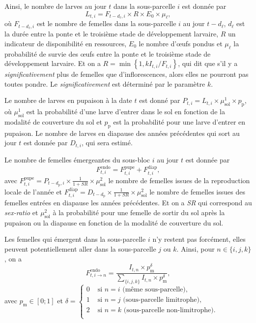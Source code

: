 Ainsi, le nombre de larves au jour $t$ dans la sous-parcelle $i$ est donnée par
\[
L_{t, i} = F_{t-d_{\ell}, i} \times R \times E_0 \times \mu_{\ell},
\]
où $F_{t-d_{\ell}, i}$ est le nombre de femelles dans la sous-parcelle $i$ au jour $t-d_{\ell}$, $d_{\ell}$ est la durée entre la ponte et le troisième stade de développement larvaire, $R$ un indicateur de disponibilité en ressources, $E_0$ le nombre d'œufs pondus et $\mu_{\ell}$ la probabilité de survie des œufs entre la ponte et le troisième stade de développement larvaire.
Et on a $R = \min\left\{1, k I_{t, i} / F_{t, i} \right\}$, qui dit que s'il y a \emph{significativement} plus de femelles que d'inflorescences, alors elles ne pourront pas toutes pondre. 
Le \emph{significativement} est déterminé par le paramètre $k$.

Le nombre de larves en pupaison à la date $t$ est donné par $P_{t, i} = L_{t, i} \times \mu^{1}_{\text{sol}} \times p_{\text{p}}$, où $\mu^{1}_{\text{sol}}$ est la probabilité d'une larve d'entrer dans le sol en fonction de la modalité de couverture du sol et $p_{\text{p}}$ est la probabilité pour une larve d'entrer en pupaison.
Le nombre de larves en diapause des années précédentes qui sort au jour $t$ est donnée par $D_{t, i}$, qui sera estimé.

Le nombre de femelles émergeantes du sous-bloc $i$ au jour $t$ est donnée par
\[
F^{\text{endo}}_{t, i} = F^{\text{pupe}}_{t, i} + F^{\text{diap}}_{t,i},
\]
avec $F^{\text{pupe}}_{t, i} = P_{t - d_{\text{p}}, i} \times \frac{1}{1 + SR} \times \mu^{2}_{\text{sol}}$ le nombre de femelles issues de la reproduction locale de l'année et $F_{t, i}^{\text{diap}} = D_{t -d_{\text{p}}} \times \frac{1}{1 + SR} \times \mu^{2}_{\text{sol}}$ le nombre de femelles issues des femelles entrées en diapause les années précédentes.
Et on a \textit{SR} qui correspond au \emph{sex-ratio} et $\mu^{2}_{\text{sol}}$ à la probabilité pour une femelle de sortir du sol après la pupaison ou la diapause en fonction de la modalité de couverture du sol.

Les femelles qui émergent dans la sous-parcelle $i$ n'y restent pas forcément, elles peuvent potentiellement aller dans la sous-parcelle $j$ ou $k$.
Ainsi, pour $n\in \{i, j, k\}$, on a
\[
F_{t, i \rightarrow n}^{\text{endo}} = \frac{I_{t, n} \times p_{\text{m}}^{\delta}}{\sum_{\{i,j,k\}} I_{t, n} \times p_{\text{m}}^{\delta}},
\]
avec $p_{\text{m}} \in [0; 1]$ et $\delta =
\begin{cases}
0 & \text{ si } n=i \text{ (même sous-parcelle),}\\
1 & \text{ si } n=j \text{ (sous-parcelle limitrophe),}\\
2 & \text{ si } n=k \text{ (sous-parcelle non-limitrophe).}\\
\end{cases}
$


